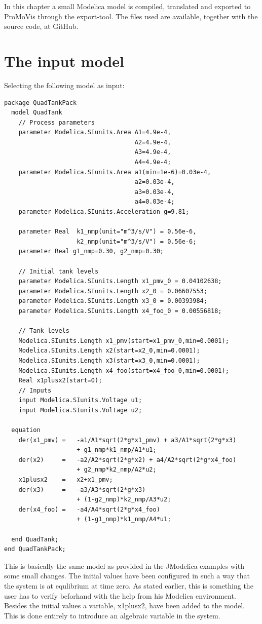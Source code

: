 In this chapter a small Modelica model is compiled, translated and exported to ProMoVis through the export-tool. The files used are available, together with the source code, at GitHub\cite{githabb}\nocite{*}.

\section{The input model}

Selecting the following model as input:\\ 
\lstset{language=modelica}
\begin{lstlisting}
package QuadTankPack
  model QuadTank
    // Process parameters
	parameter Modelica.SIunits.Area A1=4.9e-4, 
									A2=4.9e-4, 
									A3=4.9e-4, 
									A4=4.9e-4;
	parameter Modelica.SIunits.Area a1(min=1e-6)=0.03e-4, 
									a2=0.03e-4, 
									a3=0.03e-4, 
									a4=0.03e-4;
	parameter Modelica.SIunits.Acceleration g=9.81;
	
	parameter Real 	k1_nmp(unit="m^3/s/V") = 0.56e-6, 
					k2_nmp(unit="m^3/s/V") = 0.56e-6;
	parameter Real g1_nmp=0.30, g2_nmp=0.30;

    // Initial tank levels
	parameter Modelica.SIunits.Length x1_pmv_0 = 0.04102638;
	parameter Modelica.SIunits.Length x2_0 = 0.06607553;
	parameter Modelica.SIunits.Length x3_0 = 0.00393984;
	parameter Modelica.SIunits.Length x4_foo_0 = 0.00556818;
	
    // Tank levels
	Modelica.SIunits.Length x1_pmv(start=x1_pmv_0,min=0.0001);
	Modelica.SIunits.Length x2(start=x2_0,min=0.0001);
	Modelica.SIunits.Length x3(start=x3_0,min=0.0001);
	Modelica.SIunits.Length x4_foo(start=x4_foo_0,min=0.0001);
	Real x1plusx2(start=0);
	// Inputs
	input Modelica.SIunits.Voltage u1;
	input Modelica.SIunits.Voltage u2;

  equation    
    der(x1_pmv) = 	-a1/A1*sqrt(2*g*x1_pmv) + a3/A1*sqrt(2*g*x3) 
					+ g1_nmp*k1_nmp/A1*u1;						
	der(x2) 	= 	-a2/A2*sqrt(2*g*x2) + a4/A2*sqrt(2*g*x4_foo)
					+ g2_nmp*k2_nmp/A2*u2;
	x1plusx2	=	x2+x1_pmv;
	der(x3) 	= 	-a3/A3*sqrt(2*g*x3) 
					+ (1-g2_nmp)*k2_nmp/A3*u2;
	der(x4_foo) = 	-a4/A4*sqrt(2*g*x4_foo) 
					+ (1-g1_nmp)*k1_nmp/A4*u1;

  end QuadTank;
end QuadTankPack;
\end{lstlisting}
This is basically the same model as provided in the JModelica examples with some small changes. The initial values have been configured in such a way that the system is at equlibrium at time zero. As stated earlier, this is something the user has to verify beforhand with the help from his Modelica environment. Besides the initial values a variable, x1plusx2, have been added to the model. This is done entirely to introduce an algebraic variable in the system.


